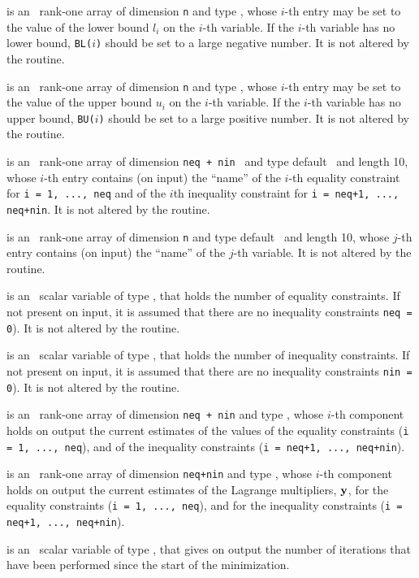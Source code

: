 \documentclass{galahad}
\begin{document}
\begin{description}
 is an \optional\ rank-one array of dimension {\tt n} and type
 \realdp, whose $i$-th entry may be set
to the value of the lower bound $l_i$ on the $i$-th variable.
If the $i$-th variable has no lower bound, {\tt BL($i$)} should be set to
a large negative number. It is not altered by the routine.

 is an \optional\ rank-one array of dimension {\tt n} and type
\realdp, whose $i$-th entry may be set
to the value of the upper bound $u_i$ on the $i$-th variable.
If the $i$-th variable has no upper bound, {\tt BU($i$)} should be set to
a large positive number.  It is not altered by the routine.

 is an \optional\  rank-one array of dimension {\tt neq + nin }
and type default \character\ and length 10, whose $i$-th entry contains (on
input) the ``name'' of the $i$-th equality constraint  for
{\tt i = 1, ..., neq} and of the $i$th inequality constraint for
{\tt i = neq+1, ..., neq+nin}.  It is not altered by the routine.

 is an \optional\ rank-one array of dimension {\tt n} and type
default \character\ and length 10, whose $j$-th entry contains (on input) the
``name'' of the $j$-th variable.  It is not altered by the routine.

 is an \optional\ scalar variable of type \integer, that holds
the number of equality constraints. If not present on input, it is assumed
that there are no inequality constraints {\tt neq = 0}). It is not altered by
the routine.

 is an \optional\ scalar variable of type \integer, that holds
the number of inequality constraints. If not present on input, it is assumed
that there are no inequality constraints {\tt nin = 0}). It is not altered by
the routine.

 is an \optional\ rank-one array of dimension {\tt neq + nin} and type
\realdp, whose $i$-th component holds on output the current
estimates of the values of the equality constraints ({\tt i = 1, ..., neq}),
and of the inequality constraints  ({\tt i = neq+1, ..., neq+nin}).

 is an \optional\ rank-one array of dimension {\tt neq+nin} and type
\realdp, whose $i$-th component holds on output the current
estimates of the Lagrange multipliers, ${\mathbf{y}}$, for the equality constraints
({\tt i = 1, ..., neq}), and for the inequality constraints  ({\tt i = neq+1,
  ..., neq+nin}).

 is an \optional\ scalar variable of type \integer, that gives
on output the number of iterations that have been performed since the start of
the  minimization.


\end{description}
\end{document}
